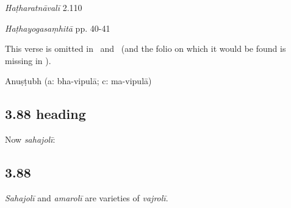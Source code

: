 \begin{ekdosis}
\begin{testimonia}[hp03_087_1]
\emph{Haṭharatnāvalī} 2.110
\begin{versinnote}
\end{versinnote}

\emph{Haṭhayogasaṃhitā} pp. 40-41
\begin{versinnote}
\end{versinnote}

\end{testimonia}

\begin{philcomm}[hp03_087_1]
This verse is omitted in \alphaTwo\ and \alphaThree\ (and the folio on which it would be found is missing in \alphaOne).
\end{philcomm}

\begin{metre}[hp03_087_1]
Anuṣṭubh (a: bha-vipulā; c: ma-vipulā)
\end{metre}

\subsection*{3.88 heading}
\begin{translation}[hp03_088a]
Now \emph{sahajolī}:
\end{translation}

\subsection*{3.88}
\begin{translation}[hp03_088]
\emph{Sahajolī} and \emph{amarolī} are varieties of \emph{vajrolī}. 
\end{translation}


\end{ekdosis}
